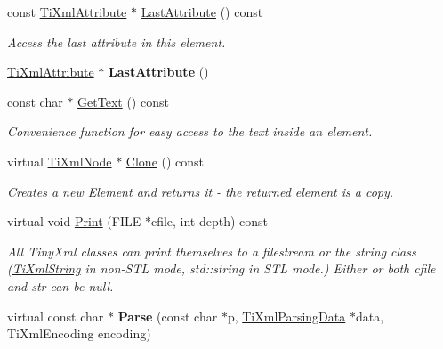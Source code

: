 \begin{DoxyCompactItemize}
\item 
const \hyperlink{class_ti_xml_attribute}{Ti\+Xml\+Attribute} $\ast$ \hyperlink{class_ti_xml_element_a86191b49f9177be132b85b14655f1381}{Last\+Attribute} () const \hypertarget{class_ti_xml_element_a86191b49f9177be132b85b14655f1381}{}\label{class_ti_xml_element_a86191b49f9177be132b85b14655f1381}

\begin{DoxyCompactList}\small\item\em Access the last attribute in this element. \end{DoxyCompactList}\item 
\hyperlink{class_ti_xml_attribute}{Ti\+Xml\+Attribute} $\ast$ {\bfseries Last\+Attribute} ()\hypertarget{class_ti_xml_element_a222f81cf06155cd108f2a68d4d176004}{}\label{class_ti_xml_element_a222f81cf06155cd108f2a68d4d176004}

\item 
const char $\ast$ \hyperlink{class_ti_xml_element_aa6dedd8a146acf3b1bc0903deb2d411a}{Get\+Text} () const 
\begin{DoxyCompactList}\small\item\em Convenience function for easy access to the text inside an element. \end{DoxyCompactList}\item 
virtual \hyperlink{class_ti_xml_node}{Ti\+Xml\+Node} $\ast$ \hyperlink{class_ti_xml_element_a13f6df105ebb1e8dc636e75cc883be32}{Clone} () const \hypertarget{class_ti_xml_element_a13f6df105ebb1e8dc636e75cc883be32}{}\label{class_ti_xml_element_a13f6df105ebb1e8dc636e75cc883be32}

\begin{DoxyCompactList}\small\item\em Creates a new Element and returns it -\/ the returned element is a copy. \end{DoxyCompactList}\item 
virtual void \hyperlink{class_ti_xml_element_ad9d0c008866982ab8d9aafae7e14d692}{Print} (F\+I\+LE $\ast$cfile, int depth) const 
\begin{DoxyCompactList}\small\item\em All Tiny\+Xml classes can print themselves to a filestream or the string class (\hyperlink{class_ti_xml_string}{Ti\+Xml\+String} in non-\/\+S\+TL mode, std\+::string in S\+TL mode.) Either or both cfile and str can be null. \end{DoxyCompactList}\item 
virtual const char $\ast$ {\bfseries Parse} (const char $\ast$p, \hyperlink{class_ti_xml_parsing_data}{Ti\+Xml\+Parsing\+Data} $\ast$data, Ti\+Xml\+Encoding encoding)\hypertarget{class_ti_xml_element_af95c9165159fd9dfdcc5b894a3fcf85b}{}\label{class_ti_xml_element_af95c9165159fd9dfdcc5b894a3fcf85b}


\end{DoxyCompactItemize}
